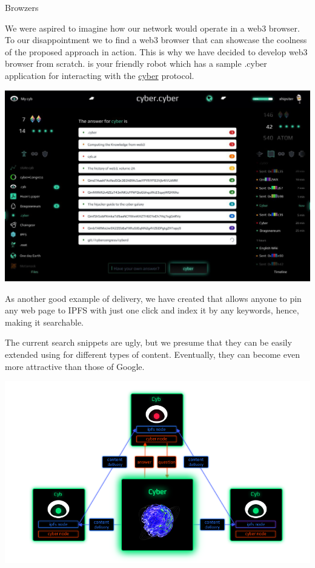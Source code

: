 \documentclass[8pt,oneside]{amsart}
\makeatletter
\newcommand{\linkred}[2]{\href{#1}{\color{red}{#2}}}
\renewcommand\subsection{\@startsection{subsection}
                                    {2}{\z@}
                                    {-3.25ex\@plus -1ex \@minus -.2ex}
                                    {0ex \@plus .2ex}
                                    {\play\Large}
                        }
\newcommand{\titleSection}[1]{\subsection{#1}}
\newenvironment{Figure}
  {\par\medskip\noindent\minipage{\linewidth}}
  {\endminipage\par\medskip}
\makeatother
\begin{document}
\titleSection{Browzers}\label{browzers}

We were aspired to imagine how our network would operate in a web3 browser. To our disappointment we \linkred{https://github.com/cybercongress/cyb/blob/master/docs/comparison.md}{were not able} to find a web3 browser that can showcase the coolness of the proposed approach in action. This is why we have decided to develop web3 browser from scratch. \linkred{https://github.com/cybercongress/cyb/blob/master/docs/cyb.md}{Cyb} is your friendly robot which has a sample .cyber application for interacting with the {\hyperref[cyber]{cyber}} protocol.

\begin{Figure}
  \medskip
  \centering
  \includegraphics[width=1\textwidth]{cyb.jpg}
  \medskip
\end{Figure}

As another good example of delivery, we have created \linkred{https://github.com/cybercongress/cyb-virus}{a Chrome extension} that allows anyone to pin any web page to IPFS with just one click and index it by any keywords, hence, making it searchable.

The current search snippets are ugly, but we presume that they can be easily extended using \linkred{https://github.com/ipld/specs}{IPLD} for different types of content. Eventually, they can become even more attractive than those of Google.

\begin{Figure}
    \centering
    \includegraphics[width=1\textwidth]{architecture.png}
\end{Figure}
\end{document}

